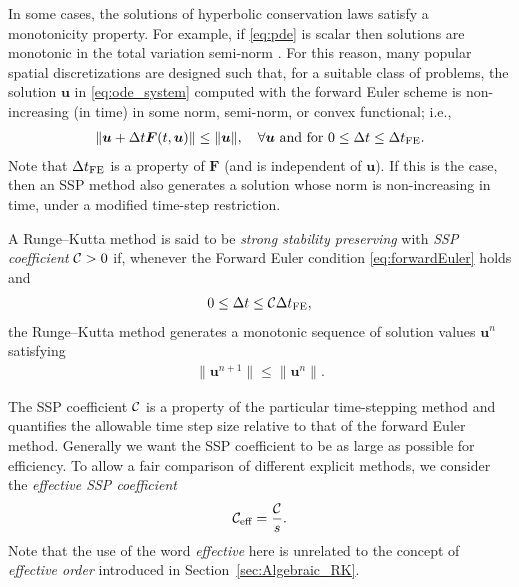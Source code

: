 In some cases, the solutions of hyperbolic conservation laws satisfy a 
monotonicity property. For example, if \eqref{eq:pde} is scalar then solutions 
are monotonic in the total variation semi-norm \cite{Ketcheson2008}.
For this reason, many popular spatial discretizations are designed such 
that, for a suitable class of problems, the solution $\bm{u}$ in 
\eqref{eq:ode_system} computed with the forward Euler scheme is 
non-increasing (in time) in some norm, semi-norm, or convex functional; i.e.,
\begin{align}\label{eq:forwardEuler}
    \|\bm{u} + \Delta t\bm{F}(t,\bm{u})\| \le \|\bm{u}\|, \quad \forall \bm{u} \text{ and for } 0 \le \Delta t \le \Delta t_{\textnormal{FE}}.
\end{align}
Note that $\Delta t_{\textnormal{FE}}$ is a property of $\bm{F}$ (and is independent of $\bm{u}$).
If this is the case, then an SSP method also generates a solution whose norm is
non-increasing in time, under a modified time-step restriction.
\begin{definition}
	A Runge--Kutta method is said to be \emph{strong stability preserving} with
	\emph{SSP coefficient} $\mathcal{C} > 0$ if, whenever the Forward Euler condition
	\eqref{eq:forwardEuler} holds and 
	\begin{align*}
		0 \leq \Delta t \leq \mathcal{C} \Delta t_{\textnormal{FE}},
	\end{align*}
	the Runge--Kutta method generates a monotonic sequence of solution values $\bm{u}^n$ satisfying
	\begin{align*}
  		\|\bm{u}^{n+1}\| \le \|\bm{u}^n\|.
	\end{align*}
\end{definition}

The SSP coefficient $\mathcal{C}$ is a property of the particular
time-stepping method and quantifies the allowable time step size relative 
to that of the forward Euler method.
Generally we want the SSP coefficient to be as large as possible for efficiency.
To allow a fair comparison of different explicit methods, we consider the 
\emph{effective SSP coefficient}
\begin{align*}
	\mathcal{C}_{\text{eff}} = \frac{\mathcal{C}}{s}.
\end{align*}
Note that the use of the word \emph{effective} here is unrelated to the 
concept of \emph{effective order} introduced in Section~\ref{sec:Algebraic_RK}.

